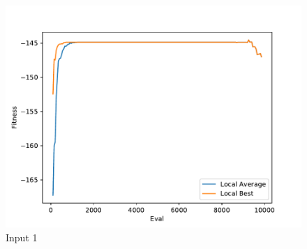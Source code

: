 \documentclass{standalone}
\begin{document}
\begin{figure}[!htb]
	\caption{Input 1}
	\label{fig:graph_1048}
	\includegraphics[width=\textwidth]{../graphs/graphs/1048.pdf}
\end{figure}
\end{document}
